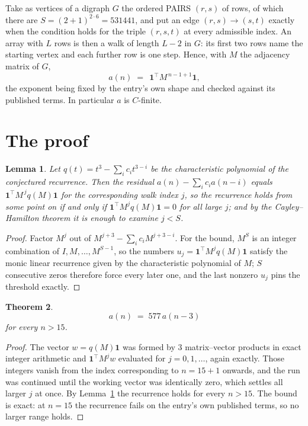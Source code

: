 \documentclass[11pt,a4paper]{article}
\theoremstyle{plain}
\newtheorem{theorem}{Theorem}
\newtheorem{lemma}[theorem]{Lemma}
\theoremstyle{definition}
\begin{document}
Take as vertices of a digraph $G$ the ordered PAIRS $(r,s)$ of rows, of which there are
$S=(2+1)^{2\cdot6}=531441$, and put an edge $(r,s)\to(s,t)$ exactly when the condition
holds for the triple $(r,s,t)$ at every admissible index. An array with $L$ rows is then a
walk of length $L-2$ in $G$: its first two rows name the starting vertex and each further
row is one step. Hence, with $M$ the adjacency matrix of $G$,
\[
a(n)\;=\;\,\mathbf{1}^{\!\top}M^{\,n-1+1}\mathbf{1},
\]
the exponent being fixed by the entry's own shape and checked against its published terms.
In particular $a$ is $C$-finite.

\section{The proof}

\begin{lemma}\label{lem:crit}
Let $q(t)=t^{3}-\sum_i c_it^{3-i}$ be the characteristic polynomial of the
conjectured recurrence. Then the residual $a(n)-\sum_ic_ia(n-i)$ equals
$\mathbf{1}^{\!\top}M^{\,j}q(M)\mathbf{1}$ for the corresponding walk index
$j$, so the recurrence holds from some point on if and only if
$\mathbf{1}^{\!\top}M^{j}q(M)\mathbf{1}=0$ for all large $j$; and by the
Cayley--Hamilton theorem it is enough to examine $j<S$.
\end{lemma}

\begin{proof}
Factor $M^{j}$ out of $M^{j+3}-\sum_ic_iM^{j+3-i}$. For the bound, $M^{S}$
is an integer combination of $I,M,\dots,M^{S-1}$, so the numbers
$u_j=\mathbf{1}^{\!\top}M^{j}q(M)\mathbf{1}$ satisfy the monic linear recurrence given by
the characteristic polynomial of $M$; $S$ consecutive zeros therefore force every later one,
and the last nonzero $u_j$ pins the threshold exactly.
\end{proof}

\begin{theorem}
\[
a(n)\;=\;577\,a(n-3)
\]
for every $n>15$.
\end{theorem}

\begin{proof}
The vector $w=q(M)\mathbf{1}$ was formed by $3$ matrix--vector products in exact
integer arithmetic and $\mathbf{1}^{\!\top}M^{j}w$ evaluated for $j=0,1,\dots$, again
exactly. Those integers vanish from the index corresponding to $n=15+1$ onwards, and the
run was continued until the working vector was identically zero, which settles all larger $j$
at once. By Lemma~\ref{lem:crit} the recurrence holds for every $n>15$. The bound is exact: at $n=15$ the recurrence fails on the entry's own published terms, so no larger range holds.
\end{proof}
\end{document}
